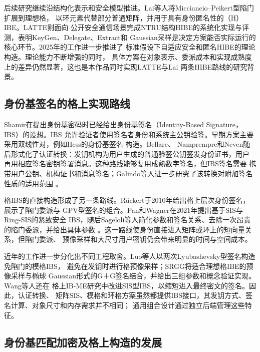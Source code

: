 后续研究继续沿结构化表示和安全模型推进。Lai等人将Micciancio--Peikert型陷门扩展到理想格，
以环元素代替部分普通矩阵，并用于具有身份匿名性的（H）IBE\cite{lai2015trapdoors}。LATTE则面向
公开安全通信场景完成NTRU结构HIBE的系统化实现与评测，表明KeyGen、Delegate、Extract和
Gaussian采样是决定方案能否实际运行的核心环节\cite{zhao2024latte}。2025年的工作进一步推进了
标准假设下自适应安全和匿名HIBE的理论构造\cite{goyal2025adaptivehibe}。理论能力不断增强的同时，
具体方案在对象表示、委派成本和实现成熟度上的差异仍然显著，这也是本作品同时实现LATTE与Lai
两条HIBE路线的研究背景。

\subsection{身份基签名的格上实现路线}

Shamir在提出身份基密码时已经给出身份基签名（Identity-Based Signature，IBS）的设想。IBS
允许验证者使用签名者身份和系统主公钥验签。早期方案主要采用双线性对，例如Hess的身份基签名
构造\cite{hess2003ibs}。Bellare、
Namprempre和Neven随后形式化了认证转换：发钥机构为用户生成的普通验签公钥签发身份证书，用户
再用相应签名密钥签署消息\cite{bellare2004ibs}。这种路线能够复用成熟数字签名，但IBS签名需要
携带用户公钥、机构证书和消息签名；Galindo等人进一步研究了该转换对附加签名性质的适用范围
\cite{galindo2006ibs}。

格IBS的直接构造形成了另一条路线。Rückert于2010年给出格上层次身份签名，展示了陷门委派与
GPV型签名的组合\cite{ruckert2010hibs}。Pan和Wagner在2021年提出基于SIS与Ring-SIS的紧致安全
IBS，随后Sageloli等人简化参数和签名关系、去除一次昂贵的陷门委派，并给出具体参数
\cite{pan2021ibs,sageloli2023ibs}。这一路线使身份直接进入矩阵或环上的短向量关系，但陷门委派、
预像采样和大尺寸用户密钥仍会带来明显的时间与空间成本。

近年的工作进一步分化出不同工程取舍。Luo等人以两次Lyubashevsky型签名构造免陷门的模格IBS，
避免在发钥时进行格预像采样\cite{luo2024ibs}；SRGG将适合理想格IBE的预像采样与椭球
Gaussian形式的G＋G签名结合，并给出三组参数和概念验证实现\cite{jia2025ibs}。Wang等人还在
格上IB-ME研究中改进SIS型IBS，以缩短进入最终密文的签名\cite{wang2024ibme}。因此，认证转换、
矩阵SIS、模格和环格方案虽然都提供IBS接口，其发钥方式、签名计算、对象尺寸和内存需求并不相同；
通用组合设计通过独立后端管理这些特征。

\subsection{身份基匹配加密及格上构造的发展}

